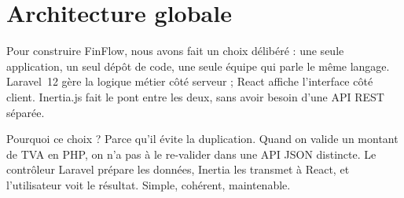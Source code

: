 \documentclass[12pt,a4paper]{report}
\begin{document}
\section{Architecture globale}

Pour construire FinFlow, nous avons fait un choix délibéré : une seule application, un seul dépôt de code, une seule équipe qui parle le même langage. Laravel~12 gère la logique métier côté serveur ; React affiche l'interface côté client. Inertia.js fait le pont entre les deux, sans avoir besoin d'une API REST séparée.

Pourquoi ce choix ? Parce qu'il évite la duplication. Quand on valide un montant de TVA en PHP, on n'a pas à le re-valider dans une API JSON distincte. Le contrôleur Laravel prépare les données, Inertia les transmet à React, et l'utilisateur voit le résultat. Simple, cohérent, maintenable.
\end{document}
